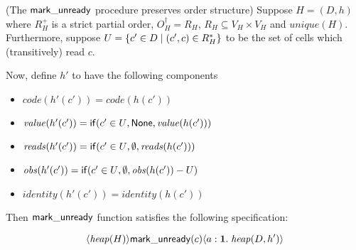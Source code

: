 \begin{lemma}{(The $\mathsf{mark\_unready}$ procedure preserves order structure)}
Suppose $H = (D,h)$ where $R^+_H$ is a strict partial order, $O^\dagger_H = R_H$,
$R_H \subseteq V_H \times V_H$ and $\mathit{unique}(H)$. Furthermore, suppose 
$U = \{{{c' \in D}\;|\;{(c',c) \in R^*_H}}\}$ to be the set of cells which (transitively)
read $c$.

Now, define $h'$ to have the following components
\begin{itemize}
\item $\mathit{code}(h'(c')) = \mathit{code}(h(c'))$
\item $\mathit{value}(h'(c')) = \mathsf{if}({c'\in U}, {\mathsf{None}}, {\mathit{value}(h(c'))})$
\item $\mathit{reads}(h'(c')) = \mathsf{if}({c'\in U}, {\emptyset}, {\mathit{reads}(h(c'))})$
\item $\mathit{obs}(h'(c')) = \mathsf{if}({c'\in U}, {\emptyset}, {\mathit{obs}(h(c')) - U})$
\item $\mathit{identity}(h'(c')) = \mathit{identity}(h(c'))$
\end{itemize}

Then $\mathsf{mark\_unready}$ function satisfies the following specification:

\begin{displaymath}
\langle{\mathit{heap}(H)}\rangle{\mathsf{mark\_unready}(c)}\langle{a:\mathbf{1}}.\;{\mathit{heap}(D,h')}\rangle
\end{displaymath}
  
\end{lemma}


